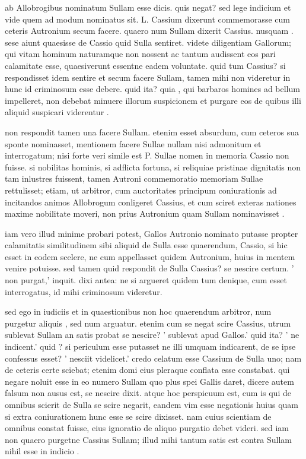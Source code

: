  ab Allobrogibus nominatum Sullam esse dicis. quis negat? sed lege indicium et vide quem ad modum nominatus sit. L. Cassium dixerunt commemorasse cum ceteris Autronium secum facere. quaero num Sullam dixerit Cassius. nusquam . sese aiunt quaesisse de Cassio quid Sulla sentiret. videte diligentiam Gallorum; qui vitam hominum naturamque non nossent ac tantum audissent eos pari calamitate esse, quaesiverunt essentne eadem voluntate. quid tum Cassius? si respondisset idem sentire et secum facere Sullam, tamen mihi non videretur in hunc id criminosum esse debere. quid ita? quia , qui barbaros homines ad bellum impelleret, non debebat minuere illorum suspicionem et purgare eos de quibus illi aliquid suspicari viderentur .

 non respondit tamen una facere Sullam. etenim esset absurdum, cum ceteros sua sponte nominasset, mentionem facere Sullae nullam nisi admonitum et interrogatum; nisi forte veri simile est P. Sullae nomen in memoria Cassio non fuisse. si nobilitas hominis, si adflicta fortuna, si reliquiae pristinae dignitatis non tam inlustres fuissent, tamen Autroni commemoratio memoriam Sullae rettulisset; etiam, ut arbitror, cum auctoritates principum coniurationis ad incitandos animos Allobrogum conligeret Cassius, et cum sciret exteras nationes maxime nobilitate moveri, non prius Autronium quam Sullam nominavisset .

 iam vero illud minime probari potest, Gallos Autronio nominato putasse propter calamitatis similitudinem sibi aliquid de Sulla esse quaerendum, Cassio, si hic esset in eodem scelere, ne cum appellasset quidem Autronium, huius in mentem venire potuisse. sed tamen quid respondit de Sulla Cassius? se nescire certum. ' non purgat,' inquit. dixi antea: ne si argueret quidem tum denique, cum esset interrogatus, id mihi criminosum videretur.

 sed ego in iudiciis et in quaestionibus non hoc quaerendum arbitror, num purgetur aliquis , sed num arguatur. etenim cum se negat scire Cassius, utrum sublevat Sullam an satis probat se nescire? ' sublevat apud Gallos.' quid ita? ' ne indicent.' quid ? si periculum esse putasset ne illi umquam indicarent, de se ipse confessus esset? ' nesciit videlicet.' credo celatum esse Cassium de Sulla uno; nam de ceteris certe sciebat; etenim domi eius pleraque conflata esse constabat. qui negare noluit esse in eo numero Sullam quo plus spei Gallis daret, dicere autem falsum non ausus est, se nescire dixit. atque hoc perspicuum est, cum is qui de omnibus scierit de Sulla se scire negarit, eandem vim esse negationis huius quam si extra coniurationem hunc esse se scire dixisset. nam cuius scientiam de omnibus constat fuisse, eius ignoratio de aliquo purgatio debet videri. sed iam non quaero purgetne Cassius Sullam; illud mihi tantum satis est contra Sullam nihil esse in indicio .

